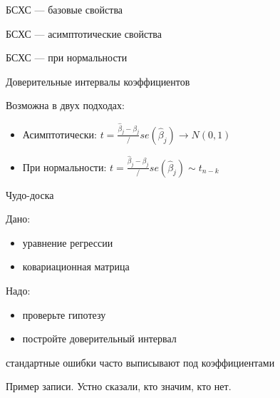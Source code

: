 \documentclass[ignorenonframetext,]{beamer}
\begin{document}
\begin{frame}{БСХС --- базовые свойства}

\end{frame}

\begin{frame}{БСХС --- асимптотические свойства}

\end{frame}

\begin{frame}{БСХС --- при нормальности}

\end{frame}

\begin{frame}{Доверительные интервалы коэффициентов}

Возможна в двух подходах:

\begin{itemize}
\item
  Асимптотически:
  $t=\frac{\hat{\beta}_j-\beta_j}/se(\hat{\beta}_j) \to N(0,1)$
\item
  При нормальности:
  $t=\frac{\hat{\beta}_j-\beta_j}/se(\hat{\beta}_j) \sim t_{n-k}$
\end{itemize}

\end{frame}

\begin{frame}{Чудо-доска}

Дано:

\begin{itemize}
\itemsep1pt\parskip0pt
\item
  уравнение регрессии
\item
  ковариационная матрица
\end{itemize}

Надо:

\begin{itemize}
\itemsep1pt\parskip0pt
\item
  проверьте гипотезу
\item
  постройте доверительный интервал
\end{itemize}

\end{frame}

\begin{frame}{стандартные ошибки часто выписывают под коэффициентами}

Пример записи. Устно сказали, кто значим, кто нет.

\end{frame}
\end{document}
